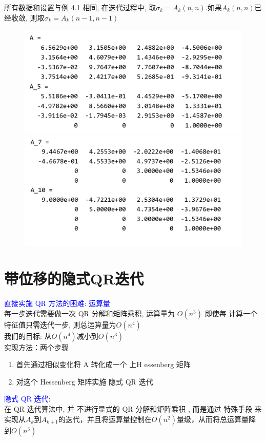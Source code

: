 \documentclass[12pt,a4paper]{article}
\begin{document}
所有数据和设置与例 4.1 相同, 在迭代过程中, 取$\sigma_{k}=A_{k}(n, n)$.如果$A_{k}(n, n)$已经收敛, 则取$\sigma_{k}=A_{k}(n-1, n-1)$
\begin{figure}
\begin{center}
\includegraphics[scale=0.6]{figure7.png}
\includegraphics[scale=0.6]{figure8.png}
\end{center}
\end{figure}
\section{带位移的隐式QR迭代}
\noindent \textcolor{blue}{直接实施 QR 方法的困难: 运算量}\\
每一步迭代需要做一次 QR 分解和矩阵乘积, 运算量为 $O\left(n^{3}\right)$ 即使每 计算一个特征值只需迭代一步, 则总运算量为$O\left(n^{4}\right)$\\
我们的目标: 从$O\left(n^{4}\right)$减小到$O\left(n^{3}\right)$\\
实现方法：两个步骤\\
\begin{enumerate}[(1)]
\item 首先通过相似变化将 A 转化成一个 上H
essenberg 矩阵
\item 对这个 Hessenberg 矩阵实施 隐式 QR 迭代
\end{enumerate}
 \textcolor{blue}{隐式 QR 迭代}:\\
 在 QR 迭代算法中, 并 不进行显式的 QR 分解和矩阵乘积 , 而是通过 特殊手段 来实现从$A_{k}$到$A_{k+1}$的迭代，并且将运算量控制在$O\left(n^{2}\right)$量级，从而将总运算量降到$O(n^{3})$
\end{document}
